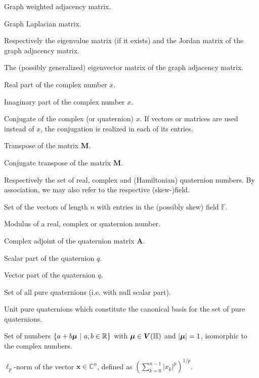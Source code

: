 

    \item[$ \mathbf{A} $] Graph weighted adjacency matrix.
    \item[$ \mathbf{L} $] Graph Laplacian matrix.
    \item[$ \mathbf{\Lambda}, \mathbf{J} $] Respectively the eigenvalue matrix (if it exists) and the Jordan matrix of the graph adjacency matrix.
    \item[$ \mathbf{V} $] The (possibly generalized) eigenvector matrix of the graph adjacency matrix.
    \item[$\mathcal{R}e \{ x \}$] Real part of the complex number $x$.
    \item[$\mathcal{I}m \{ x \}$] Imaginary part of the complex number $x$.
    \item[$ \overline{x} $] Conjugate of the complex (or quaternion) $x$. If vectors or matrices are used instead of $x$, the conjugation is realized in each of its entries.
    \item[$\mathbf{M}^T$] Transpose of the matrix $\mathbf{M}$.
    \item[$\mathbf{M}^H$] Conjugate transpose of the matrix $\mathbf{M}$.
    \item[$\mathbb{R}$, $\mathbb{C}$ and $\mathbb{H}$] Respectively the set of real, complex and (Hamiltonian) quaternion numbers. By association, we may also refer to the respective (skew-)field.
    \item[$\mathbb{F}^n$] Set of the vectors of length $n$ with entries in the (possibly skew) field $\mathbb{F}$.
    \item[$ | \cdot | $] Modulus of a real, complex or quaternion number.
    \item[$ \rchi_A $] Complex adjoint of the quaternion matrix $ \mathbf{A} $.
    \item[$ S(q) $] Scalar part of the quaternion $q$.
    \item[$ \qV(q) $] Vector part of the quaternion $q$.
    \item[$ \qV(\mathbb{H}) $] Set of all pure quaternions (i.e. with null scalar part).
    \item[$ \qi $, $ \qj $ and $ \qk $] Unit pure quaternions which constitute the canonical basis for the set of pure quaternions.
    \item[$ \mathbb{C}_{\qmu}$] Set of numbers $\{ a + b\boldsymbol{\mu} \ | \ a, b \in \mathbb{R} \}$ with $\boldsymbol{\mu} \in \boldsymbol{V}(\mathbb{H})$ and $|\boldsymbol{\mu}| = 1$, isomorphic to the complex numbers.
    \item[$ \Vert \mathbf{x}\Vert_p $] $ \ell_p $-norm of the vector $\mathbf{x} \in \mathbb{C}^n$, defined as $\left(\sum_{k=0}^{n-1} |x_k|^p\right)^{1/p}$.
